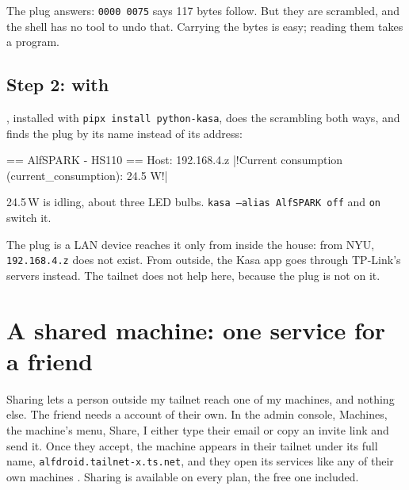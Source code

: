 \documentclass[11pt,a4paper]{article}
\renewcommand{\panetitle}{Shared pane 5.2, logged in to \name{AlfSPARK}}
\begin{document}
The plug answers: \texttt{0000 0075} says 117 bytes follow. But they are scrambled, and the shell has no tool to undo that. Carrying the bytes is easy; reading them takes a program.

\subsection*{Step 2: with }

, installed with \texttt{pipx install python-kasa}, does the scrambling both ways, and finds the plug by its name instead of its address:

\renewcommand{\panetitle}{A shell on \name{AlfMAC5}}
\begin{cmdout}
== AlfSPARK - HS110 ==
Host: 192.168.4.z
|!Current consumption (current_consumption): 24.5 W!|
\end{cmdout}

24.5\,W is  idling, about three LED bulbs. \texttt{kasa --alias AlfSPARK off} and \texttt{on} switch it.

\begin{result}{The plug is a LAN device}
 reaches it only from inside the house: from NYU, \texttt{192.168.4.z} does not exist. From outside, the Kasa app goes through TP-Link's servers instead. The tailnet does not help here, because the plug is not on it.
\end{result}

\section{A shared machine: one service for a friend}

Sharing lets a person outside my tailnet reach one of my machines, and nothing else. The friend needs a  account of their own. In the admin console, Machines, the machine's menu, Share, I either type their email or copy an invite link and send it. Once they accept, the machine appears in their tailnet under its full name, \texttt{alfdroid.tailnet-x.ts.net}, and they open its services like any of their own machines \cite{tssharing}. Sharing is available on every plan, the free one included.
\end{document}
